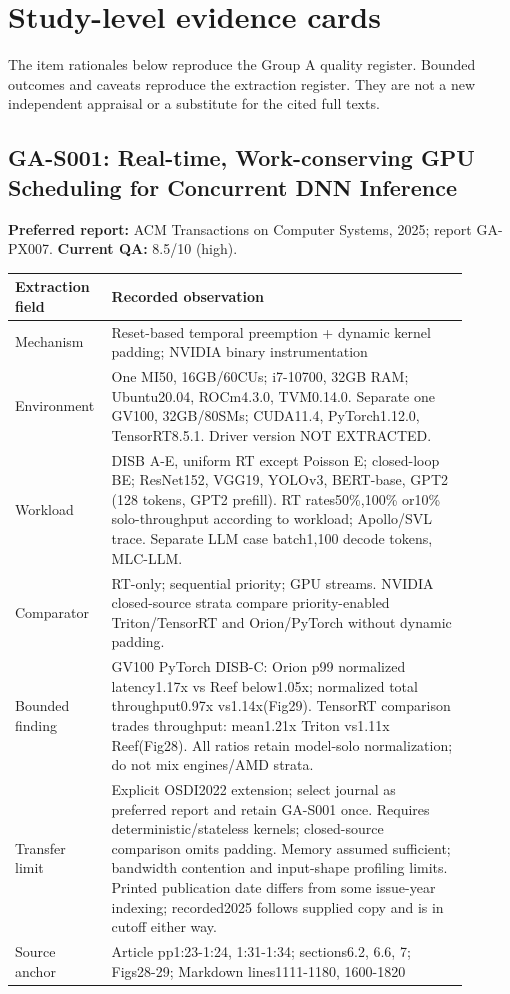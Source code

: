 \section{Study-level evidence cards}\label{app:cards}
The item rationales below reproduce the Group A quality register. Bounded outcomes and caveats reproduce the extraction register. They are not a new independent appraisal or a substitute for the cited full texts.
\subsection{GA-S001: Real-time, Work-conserving GPU Scheduling for Concurrent DNN Inference}
\textbf{Preferred report:} ACM Transactions on Computer Systems, 2025; report GA-PX007. \textbf{Current QA:} 8.5/10 (high).
\begin{longtable}{P{0.15\linewidth}P{0.75\linewidth}}
\toprule Extraction field & Recorded observation\\\midrule\endhead
Mechanism & Reset-based temporal preemption + dynamic kernel padding; NVIDIA binary instrumentation\\
Environment & One MI50, 16GB/60CUs; i7-10700, 32GB RAM; Ubuntu20.04, ROCm4.3.0, TVM0.14.0. Separate one GV100, 32GB/80SMs; CUDA11.4, PyTorch1.12.0, TensorRT8.5.1. Driver version NOT EXTRACTED.\\
Workload & DISB A-E, uniform RT except Poisson E; closed-loop BE; ResNet152, VGG19, YOLOv3, BERT-base, GPT2 (128 tokens, GPT2 prefill). RT rates50\%,100\% or10\% solo-throughput according to workload; Apollo/SVL trace. Separate LLM case batch1,100 decode tokens, MLC-LLM.\\
Comparator & RT-only; sequential priority; GPU streams. NVIDIA closed-source strata compare priority-enabled Triton/TensorRT and Orion/PyTorch without dynamic padding.\\
Bounded finding & GV100 PyTorch DISB-C: Orion p99 normalized latency1.17x vs Reef below1.05x; normalized total throughput0.97x vs1.14x(Fig29). TensorRT comparison trades throughput: mean1.21x Triton vs1.11x Reef(Fig28). All ratios retain model-solo normalization; do not mix engines/AMD strata.\\
Transfer limit & Explicit OSDI2022 extension; select journal as preferred report and retain GA-S001 once. Requires deterministic/stateless kernels; closed-source comparison omits padding. Memory assumed sufficient; bandwidth contention and input-shape profiling limits. Printed publication date differs from some issue-year indexing; recorded2025 follows supplied copy and is in cutoff either way.\\
Source anchor & Article pp1:23-1:24, 1:31-1:34; sections6.2, 6.6, 7; Figs28-29; Markdown lines1111-1180, 1600-1820\\
\bottomrule\end{longtable}
